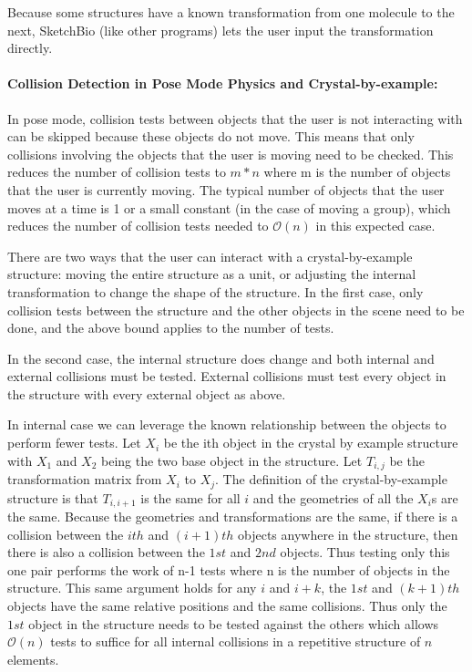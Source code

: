 \documentclass[twocolumn]{bmcart}%
\begin{document}
Because some structures have a known transformation from one molecule to the next, SketchBio (like other programs) lets the user input the transformation directly.

\paragraph*{Collision Detection in Pose Mode Physics and Crystal-by-example:}
In pose mode, collision tests between objects that the user is not interacting with can be skipped because these objects do not move.
This means that only collisions involving the objects that the user is moving need to be checked.
This reduces the number of collision tests to $m*n$ where m is the number of objects that the user is currently moving.
The typical number of objects that the user moves at a time is 1 or a small constant (in the case of moving a group), which reduces the number of collision tests needed to $\mathcal{O}(n)$ in this expected case.

There are two ways that the user can interact with a crystal-by-example structure: moving the entire structure as a unit, or adjusting the internal transformation to change the shape of the structure.
In the first case, only collision tests between the structure and the other objects in the scene need to be done, and the above bound applies to the number of tests.

In the second case, the internal structure does change and both internal and external collisions must be tested.
External collisions must test every object in the structure with every external object as above.

In internal case we can leverage the known relationship between the objects to perform fewer tests.  Let $X_i$ be the ith object in the crystal by example structure with $X_1$ and $X_2$ being the two base object in the structure.
Let $T_{i,j}$ be the transformation matrix from $X_i$ to $X_j$.
The definition of the crystal-by-example structure is that $T_{i,i+1}$ is the same for all $i$ and the geometries of all the $X_i$s are the same.
Because the geometries and transformations are the same, if there is a collision between the $ith$ and $(i+1)th$ objects anywhere in the structure, then there is also a collision between the $1st$ and $2nd$ objects.
Thus testing only this one pair performs the work of n-1 tests where n is the number of objects in the structure.
This same argument holds for any $i$ and $i+k$, the $1st$ and $(k+1)th$ objects have the same relative positions and the same collisions.
Thus only the $1st$ object in the structure needs to be tested against the others which allows $\mathcal{O}(n)$ tests to suffice for all internal collisions in a repetitive structure of $n$ elements.
\end{document}
